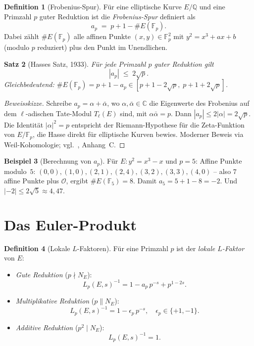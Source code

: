 \documentclass[12pt,a4paper]{amsart}
\newtheorem{theorem}{Satz}[section]
\theoremstyle{definition}
\newtheorem{definition}[theorem]{Definition}
\newtheorem{example}[theorem]{Beispiel}
\newcommand{\Q}{\mathbb{Q}}
\newcommand{\C}{\mathbb{C}}
\newcommand{\Fp}{\mathbb{F}_p}
\begin{document}
\begin{definition}[Frobenius-Spur]
\label{def:ap}
F\"ur eine elliptische Kurve $E/\Q$ und eine Primzahl $p$ guter Reduktion
ist die \emph{Frobenius-Spur} definiert als
\[
  a_p \;=\; p + 1 - \#E(\Fp).
\]
Dabei z\"ahlt $\#E(\Fp)$ alle affinen Punkte $(x,y) \in \Fp^2$ mit
$y^2 = x^3 + ax + b$ (modulo $p$ reduziert) plus den Punkt im Unendlichen.
\end{definition}

\begin{theorem}[Hasses Satz, 1933]
\label{thm:hasse}
F\"ur jede Primzahl $p$ guter Reduktion gilt
\[
  |a_p| \;\le\; 2\sqrt{p}.
\]
Gleichbedeutend: $\#E(\Fp) = p+1-a_p \in [p+1-2\sqrt{p},\; p+1+2\sqrt{p}]$.
\end{theorem}

\begin{proof}[Beweisskizze]
Schreibe $a_p = \alpha + \bar\alpha$, wo $\alpha, \bar\alpha \in \C$ die
Eigenwerte des Frobenius auf dem $\ell$-adischen Tate-Modul $T_\ell(E)$
sind, mit $\alpha\bar\alpha = p$.
Dann $|a_p| \le 2|\alpha| = 2\sqrt{p}$.
Die Identit\"at $|\alpha|^2 = p$ entspricht der Riemann-Hypothese f\"ur die
Zeta-Funktion von $E/\Fp$, die Hasse direkt f\"ur elliptische Kurven bewies.
Moderner Beweis via Weil-Kohomologie; vgl.\ \cite{Silverman1986}, Anhang~C.
\end{proof}

\begin{example}[Berechnung von $a_p$]
\label{ex:ap}
F\"ur $E: y^2 = x^3 - x$ und $p = 5$:
Affine Punkte modulo~$5$: $(0,0), (1,0), (2,1), (2,4), (3,2), (3,3), (4,0)$
-- also $7$ affine Punkte plus $\mathcal{O}$, ergibt $\#E(\mathbb{F}_5) = 8$.
Damit $a_5 = 5+1-8 = -2$. Und $|-2| \le 2\sqrt{5} \approx 4{,}47$. \checkmark
\end{example}

\section{Das Euler-Produkt}

\begin{definition}[Lokale $L$-Faktoren]
\label{def:local_factors}
F\"ur eine Primzahl $p$ ist der \emph{lokale $L$-Faktor} von $E$:
\begin{itemize}
  \item \emph{Gute Reduktion} ($p \nmid N_E$):
    \[
      L_p(E,s)^{-1} = 1 - a_p\,p^{-s} + p^{1-2s}.
    \]
  \item \emph{Multiplikative Reduktion} ($p \| N_E$):
    \[
      L_p(E,s)^{-1} = 1 - \epsilon_p\,p^{-s}, \quad \epsilon_p \in \{+1,-1\}.
    \]
  \item \emph{Additive Reduktion} ($p^2 \mid N_E$):
    \[
      L_p(E,s)^{-1} = 1.
    \]
\end{itemize}
\end{definition}
\end{document}
